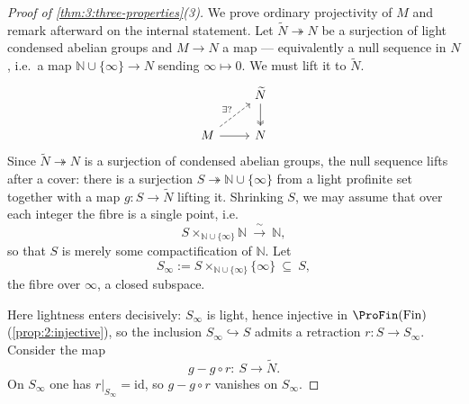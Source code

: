 \begin{proof}[Proof of \cref{thm:3:three-properties}(3)]
We prove ordinary projectivity of $M$ and remark afterward on the internal
statement. Let $\widetilde{N}\twoheadrightarrow N$ be a surjection of light
condensed abelian groups and $M\to N$ a map --- equivalently a null sequence in
$N$, i.e.\ a map $\mathbb{N}\cup\{\infty\}\to N$ sending $\infty\mapsto 0$. We
must lift it to $\widetilde{N}$.
\[
\begin{tikzcd}
& \widetilde{N} \arrow[d, two heads] \\
M \arrow[r] \arrow[ur, dashed, "\exists?"] & N
\end{tikzcd}
\]
Since $\widetilde{N}\twoheadrightarrow N$ is a surjection of condensed abelian
groups, the null sequence lifts after a cover: there is a surjection
$S\twoheadrightarrow\mathbb{N}\cup\{\infty\}$ from a light profinite set together
with a map $g\colon S\to\widetilde{N}$ lifting it. Shrinking $S$, we may assume
that over each integer the fibre is a single point, i.e.
\begin{equation*}
S\times_{\mathbb{N}\cup\{\infty\}}\mathbb{N}\ \xrightarrow{\ \sim\ }\ \mathbb{N},
\end{equation*}
so that $S$ is merely some compactification of $\mathbb{N}$. Let
\begin{equation*}
S_\infty:=S\times_{\mathbb{N}\cup\{\infty\}}\{\infty\}\ \subseteq\ S,
\end{equation*}
the fibre over $\infty$, a closed subspace.

Here lightness enters decisively: $S_\infty$ is light, hence injective in
$\ProFin(\mathrm{Fin})$ (\cref{prop:2:injective}), so the inclusion
$S_\infty\hookrightarrow S$ admits a retraction $r\colon S\to S_\infty$. Consider
the map
\begin{equation*}
g-g\circ r\colon\ S\longrightarrow \widetilde{N}.
\end{equation*}
On $S_\infty$ one has $r|_{S_\infty}=\mathrm{id}$, so $g-g\circ r$ vanishes on
$S_\infty$.


\end{proof}

